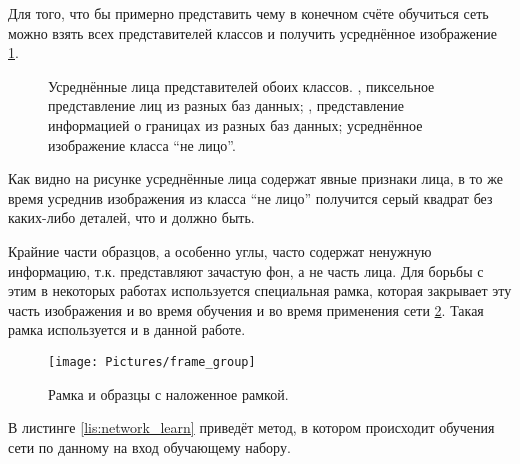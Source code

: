 \documentclass[12pt]{report}
\begin{document}
Для того, что бы примерно представить чему в конечном счёте обучиться сеть можно взять всех представителей классов 
и 
получить усреднённое изображение \ref{fig:avg_faces}.

\begin{figure}[h]
	\centering
	\caption{Усреднённые лица представителей обоих классов. ,  
пиксельное представление лиц из разных баз данных; ,  
представление информацией о границах из разных баз данных;  усреднённое изображение класса 
``не лицо''.}
	\label{fig:avg_faces}
\end{figure}
Как видно на рисунке усреднённые лица содержат явные признаки лица, в то же время усреднив изображения из класса 
``не 
лицо'' получится серый квадрат без каких-либо деталей, что и должно быть.

Крайние части образцов, а особенно углы, часто содержат ненужную информацию, т.к. представляют зачастую 
фон, а не часть лица. Для борьбы с этим в некоторых работах используется специальная рамка, которая закрывает эту 
часть изображения и во время обучения и во время применения сети \ref{fig:frame}. Такая рамка используется и в 
данной работе.

\begin{figure}[h]
	\centering
	\texttt{[image: Pictures/frame\_group]}
	\caption{Рамка и образцы с наложенное рамкой.}
	\label{fig:frame}
\end{figure}

В листинге \ref{lis:network_learn} приведёт метод, в котором происходит обучения сети по данному на вход обучающему 
набору.
\lstset{caption=Обучение сети на основе данного обучающего набора.,
label=lis:network_learn,
basicstyle=\footnotesize\ttfamily,
captionpos=b,
breaklines=true,
breakatwhitespace=false,
numbers=left,
numbersep=5pt,
language=Python,
}

\end{document}
